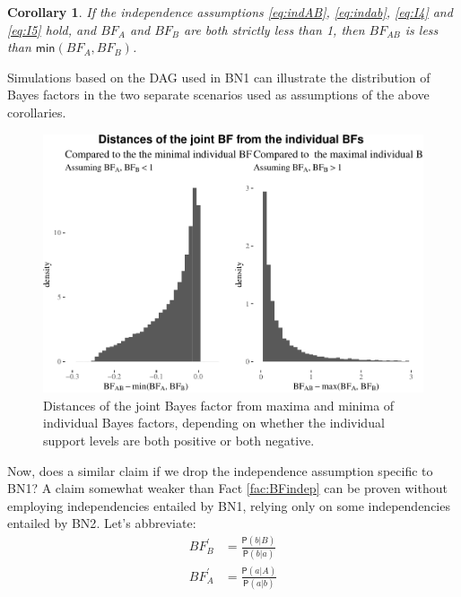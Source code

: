 \documentclass[
  10pt,
  dvipsnames,enabledeprecatedfontcommands]{scrartcl}
\newcommand{\pr}[1]{\ensuremath{\mathsf{P}(#1)}}
\newtheorem{corollary}{Corollary}[fact]
\begin{document}
\begin{corollary} If the independence assumptions \eqref{eq:indAB}, \eqref{eq:indab}, \eqref{eq:I4} and \eqref{eq:I5} hold, and $BF_{A}$ and $BF_{B}$ are both strictly less than 1, then $BF_{AB}$  is less than  $\mathsf{min}(BF_{A}, BF_{B})$. \label{cor:BFind3}
\end{corollary}

Simulations based on the DAG used in \textsf{BN1} can illustrate the
distribution of Bayes factors in the two separate scenarios used as
assumptions of the above corollaries.

\vspace{1mm}
\footnotesize

\normalsize

\begin{figure}[ht]

\begin{center}\includegraphics[width=1\linewidth]{conjunction-appendix_files/figure-latex/BFind-1} \end{center}
\caption{Distances of the joint Bayes factor from maxima and minima of individual Bayes factors, depending on whether the individual support levels are both positive or both negative.}
\end{figure}

Now, does a similar claim if we drop the independence assumption
specific to \textsf{BN1}? A claim somewhat weaker than Fact
\ref{fac:BFindep} can be proven without employing independencies
entailed by \textsf{BN1}, relying only on some independencies entailed
by \textsf{BN2}. Let's abbreviate: \begin{align*}
BF^{'}_{B} & = \frac{\pr{b \vert B}}{\pr{b\vert a}} \\
BF^{'}_{A} & = \frac{\pr{a \vert A}}{\pr{a \vert b}}
\end{align*}
\end{document}

